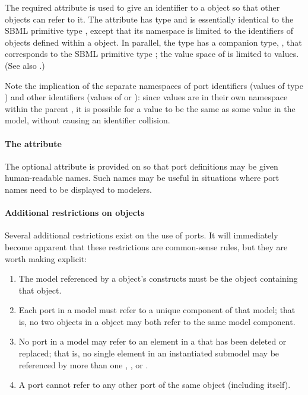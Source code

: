 The required attribute  is used to give an identifier to a
\Port object so that other objects can refer to it.  The attribute has
type  and is essentially identical to the SBML
primitive type , except that its namespace is limited to
the identifiers of \Port objects defined within a \Model object.  In
parallel, the  type has a companion type,
, that corresponds to the SBML primitive type
; the value space of  is limited
to  values.  (See also .)

Note the implication of the separate namespaces of port identifiers
(values of type ) and other identifiers (values of
 or ): since  values
are in their own namespace within the parent \Model, it is possible for
a  value to be the same as some  value
in the model, without causing an identifier collision.


\paragraph{The \fixttspace{} attribute}

The optional  attribute is provided on \Port so that port
definitions may be given human-readable names.  Such names may be useful
in situations where port names need to be displayed to modelers.


\paragraph{Additional restrictions on  objects}

Several additional restrictions exist on the use of ports.  It will
immediately become apparent that these restrictions are common-sense
rules, but they are worth making explicit:

\begin{enumerate}

  \item The model referenced by a \Port object's \SBaseRef constructs
    must be the \Model object containing that \Port object.

  \item Each port in a model must refer to a unique component of that
    model; that is, no two \Port objects in a \Model object may both
    refer to the same model component.

  \item No port in a model may refer to an element in a \Submodel 
    that has been deleted or replaced; that is, no single element 
    in an instantiated submodel may be referenced
    by more than one \Port, \ReplacedElement, or \Deletion.

  \item A port cannot refer to any other port of the same \Model
    object (including itself).

\end{enumerate}
  
